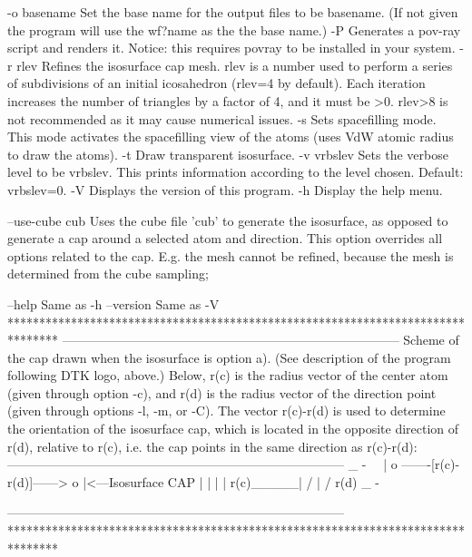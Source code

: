   -o basename	Set the base name for the output files to be basename.
            	  (If not given the program will use the wf?name as the
            	  the base name.)
  -P        	Generates a pov-ray script and renders it. Notice: this requires
            	   povray to be installed in your system.
  -r rlev   	Refines the isosurface cap mesh. rlev is a number used to
            	  perform a series of subdivisions of an initial icosahedron 
            	  (rlev=4 by default). Each iteration increases
            	  the number of triangles by a factor of 4, and it must be >0.
            	  rlev>8 is not recommended as it may cause numerical issues.
  -s        	Sets spacefilling mode. This mode activates the spacefilling
            	  view of the atoms (uses VdW atomic radius to draw the atoms).
  -t        	Draw transparent isosurface.
  -v vrbslev	Sets the verbose level to be vrbslev. This prints information according to
            	  the level chosen. Default: vrbslev=0.
  -V     	Displays the version of this program.
  -h     	Display the help menu.

  --use-cube cub 		Uses the cube file 'cub' to generate the isosurface,
                 		  as opposed to generate a cap around a selected atom
                 		  and direction. This option overrides all options
                 		  related to the cap. E.g. the mesh cannot be refined,
                 		  because the mesh is determined from the cube sampling;
                 		  
  --help    		Same as -h
  --version 		Same as -V
********************************************************************************
--------------------------------------------------------------------------------
Scheme of the cap drawn when the isosurface is option a).
(See description of the program following DTK logo, above.)
Below, r(c) is the radius vector
of the center atom (given through option -c), and r(d)
is the radius vector of the direction point (given through options
-l, -m, or -C).
The vector r(c)-r(d) is used to determine the orientation of the
isosurface cap, which is located in the opposite direction of r(d),
relative to r(c), i.e. the cap points in the same direction as
r(c)-r(d):
--------------------------------------------------------------------------------
                                     _
                                       -
                                         \
                                           \
                                            |
       o  -------[r(c)-r(d)]------> o        |<---Isosurface CAP
       |                            |       |
       |                   r(c)_____|      /
       |                                 /
     r(d)                            _ -

--------------------------------------------------------------------------------
********************************************************************************
